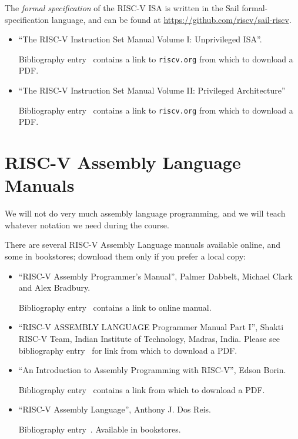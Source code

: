 The \emph{formal specification} of the RISC-V ISA is written in the
Sail formal-specification language, and can be found at
\url{https://github.com/riscv/sail-riscv}.

\begin{itemize}

\item ``The RISC-V Instruction Set Manual Volume I: Unprivileged ISA''.  

  Bibliography entry~\cite{RISCV_Unpriv_2019_12_13} contains a link
  to {\tt riscv.org} from which to download a PDF.

\item ``The RISC-V Instruction Set Manual Volume II: Privileged Architecture''

  Bibliography entry~\cite{RISCV_Priv_2021_12_03} contains a link
  to {\tt riscv.org} from which to download a PDF.

\end{itemize}


\section{RISC-V Assembly Language Manuals}

\label{apx_resources_asm_manuals}

We will not do very much assembly language programming, and we will
teach whatever notation we need during the course.

There are several RISC-V Assembly Language manuals available online,
and some in bookstores; download them only if you prefer a local copy:

\begin{itemize}

\item ``RISC-V Assembly Programmer's Manual'', 
    Palmer Dabbelt, Michael Clark and Alex Bradbury.

    Bibliography entry~\cite{Dabbelt2023} contains a link to online manual.

\item ``RISC-V ASSEMBLY LANGUAGE Programmer Manual Part I'', Shakti
    RISC-V Team, Indian Institute of Technology, Madras, India.
    Please see bibliography entry~\cite{Shakti_RISCV_ASM_Manual} for link
    from which to download a PDF.

\item ``An Introduction to Assembly Programming with RISC-V'', Edson Borin.

    Bibliography entry~\cite{Borin2021} contains a link
    from which to download a PDF.

\item ``RISC-V Assembly Language'',
    Anthony J. Dos Reis.

    Bibliography entry~\cite{DosReis2019}.  Available in bookstores.

\end{itemize}

